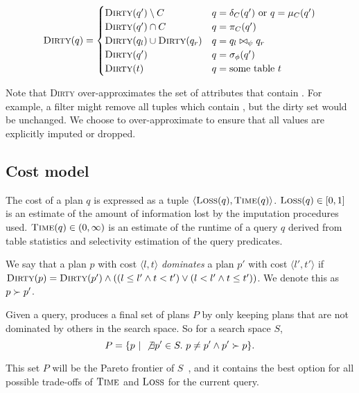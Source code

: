 \begin{align*}
  \textsc{Dirty}(q) = \begin{cases}
    \textsc{Dirty}(q') \setminus C & q = \delta_C(q')\ \text{or}\ q = \mu_C(q') \\
    \textsc{Dirty}(q') \cap C & q = \pi_C(q') \\
    \textsc{Dirty}(q_l) \cup \textsc{Dirty}(q_r) & q = q_l \bowtie_\psi q_r \\
    \textsc{Dirty}(q') & q = \sigma_\phi(q') \\
    \textsc{Dirty}(t) & q = \text{some table}\ t \\
  \end{cases}
\end{align*}

Note that \textsc{Dirty} over-approximates the set of attributes that contain \nullv{}. For example, a filter might remove all tuples which contain \nullv{}, but the dirty set would be unchanged. We choose to over-approximate to ensure that all \nullv{} values are explicitly imputed or dropped.


\subsection{Cost model}
\label{sec:cost-model}
The cost of a plan $q$ is expressed as a tuple $\langle \textsc{Loss}(q), \textsc{Time}(q) \rangle$.
$\textsc{Loss}(q) \in [0,1]$ is an estimate of the amount of information lost by the imputation procedures used.
$\textsc{Time}(q) \in (0, \infty)$ is an estimate of the runtime of a query $q$ derived from table statistics and selectivity estimation of the query predicates. 

\begin{definition}
We say that a plan $p$ with cost $\langle l, t \rangle$ \emph{dominates} a plan $p'$ with cost $\langle l', t' \rangle$ if $\textsc{Dirty}(p) = \textsc{Dirty}(p') \land ((l \leq l' \land t < t') \lor (l < l' \land t \leq t'))$. We denote this as $p \succ p'$. 
\end{definition}

Given a query, \ProjectName{} produces a final set of plans $P$ by only keeping plans that are not dominated by others in the search space. So for a search space $S$, \[P= \{ p ~|~ \not\exists p' \in S.\ p \neq p' \land p' \succ p \}.\]
 
This set $P$ will be the Pareto frontier of $S$~\cite{pareto1964cours}, and it contains the best option for all possible trade-offs of $\textsc{Time}$ and $\textsc{Loss}$ for the current query.

